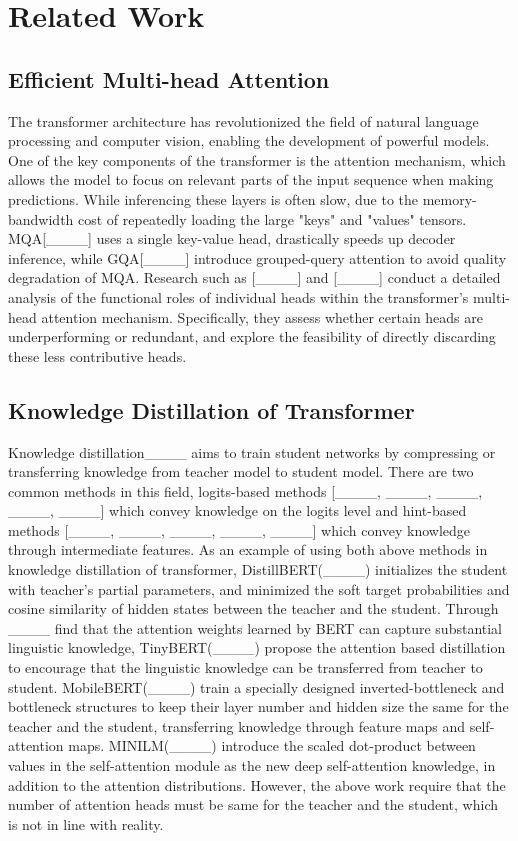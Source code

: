 \section{Related Work}
\subsection{Efficient Multi-head Attention}
The transformer architecture has revolutionized the field of natural language processing and computer vision, enabling the development of powerful models. One of the key components of the transformer is the attention mechanism, which allows the model to focus on relevant parts of the input sequence when making predictions. While inferencing these layers is often slow, due to the memory-bandwidth cost of repeatedly loading the large "keys" and "values" tensors. MQA[____] uses a single key-value head, drastically speeds up decoder inference, while GQA[____] introduce grouped-query attention to avoid quality degradation of MQA. Research such as [____] and [____] conduct a detailed analysis of the functional roles of individual heads within the transformer's multi-head attention mechanism. Specifically, they assess whether certain heads are underperforming or redundant, and explore the feasibility of directly discarding these less contributive heads.
\subsection{Knowledge Distillation of Transformer}
Knowledge distillation____ aims to train student networks by compressing or transferring knowledge from teacher model to student model. There are two common methods in this field, logits-based methods [____, ____, ____, ____, ____] which convey knowledge on the logits level and hint-based methods [____, ____, ____, ____, ____] which convey knowledge through intermediate features. As an example of using both above methods in knowledge distillation of transformer, DistillBERT(____) initializes the student with teacher’s partial parameters, and minimized the soft target probabilities and cosine similarity of hidden states between the teacher and the student. Through ____ find that the attention weights learned by BERT can capture substantial linguistic knowledge, TinyBERT(____) propose the attention based distillation to encourage that the linguistic knowledge can be transferred from teacher to student. MobileBERT(____) train a specially designed inverted-bottleneck and bottleneck structures to keep their layer number and hidden size the same for the teacher and the student, transferring knowledge through feature maps and self-attention maps. MINILM(____) introduce the scaled dot-product between values in the self-attention module as the new deep self-attention knowledge, in addition to the attention distributions. However, the above work require that the number of attention heads must be same for the teacher and the student, which is not in line with reality. 

